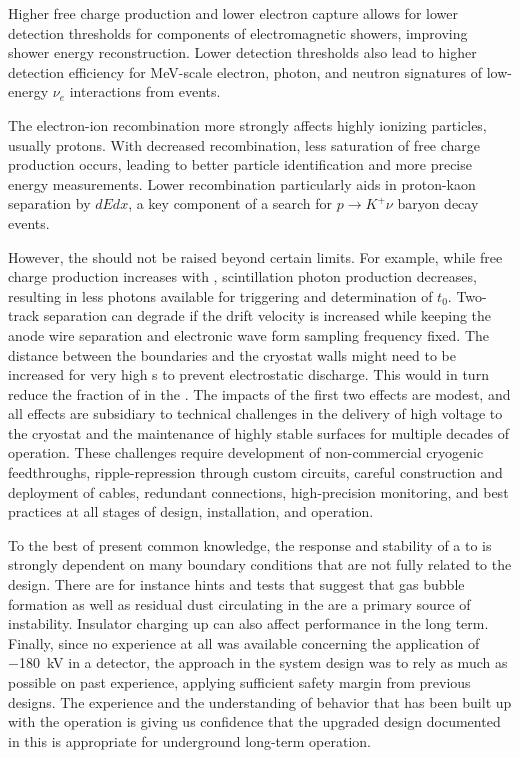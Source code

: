 Higher free charge production and lower electron capture allows for lower detection thresholds for components of electromagnetic showers, improving shower energy reconstruction. Lower detection thresholds also lead to higher detection efficiency for MeV-scale electron, photon, and neutron signatures of low-energy $\nu_e$ interactions from  events.  

The electron-ion recombination more strongly affects highly ionizing particles, usually protons.  With decreased recombination, less saturation of free charge production occurs,  leading to better particle identification and more precise energy measurements.  Lower recombination particularly aids in proton-kaon separation by $dEdx$, a key component of a search for $p\rightarrow K^+ \nu$ baryon decay events. 

However, the \efield should not be raised beyond certain limits. For example, while free charge production increases with \efield, scintillation photon production decreases, resulting in less photons available for triggering and determination of $t_0$. Two-track separation can degrade if the drift velocity is increased while keeping the anode wire separation and electronic wave form sampling frequency fixed. The distance between the  boundaries and the cryostat walls might  need to be increased for very high \efield{}s to prevent electrostatic discharge. This would in turn reduce the fraction of  in the . The impacts of the first two effects are modest, and all effects are subsidiary to technical challenges in the delivery of high voltage to the cryostat and the maintenance of highly stable    surfaces for multiple decades of operation. These challenges require development of non-commercial cryogenic  feedthroughs,  ripple-repression through custom   circuits, careful construction and deployment of  cables, redundant  connections, high-precision monitoring, and best practices at all stages of design, installation, and operation.


To the best of present common knowledge, the response and stability of a  to  is strongly dependent on many boundary conditions that are not fully related to the   design. There are for instance hints and tests that suggest that gas bubble formation as well as residual dust circulating in the  are a primary source of  instability.  Insulator charging up can also affect  performance in the long term. Finally, since no experience at all was available concerning the application of \SI{-180}{\kV} in a  detector, the approach in the  system design was to rely as much as possible on past experience, applying sufficient safety margin from previous designs.  The experience and the understanding of  behavior that has been built up  with the  operation is giving us confidence that the upgraded design documented in this  is appropriate for underground long-term operation.  

